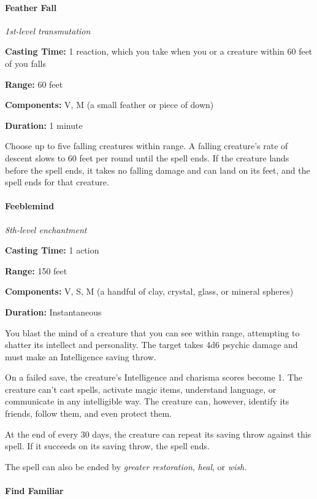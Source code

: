 \documentclass[
]{article}
\begin{document}
\hypertarget{feather-fall}{%
\paragraph{Feather Fall}\label{feather-fall}}

\emph{1st-level transmutation}

\textbf{Casting Time:} 1 reaction, which you take when you or a creature
within 60 feet of you falls

\textbf{Range:} 60 feet

\textbf{Components:} V, M (a small feather or piece of down)

\textbf{Duration:} 1 minute

Choose up to five falling creatures within range. A falling creature's
rate of descent slows to 60 feet per round until the spell ends. If the
creature lands before the spell ends, it takes no falling damage and can
land on its feet, and the spell ends for that creature.

\hypertarget{feeblemind}{%
\paragraph{Feeblemind}\label{feeblemind}}

\emph{8th-level enchantment}

\textbf{Casting Time:} 1 action

\textbf{Range:} 150 feet

\textbf{Components:} V, S, M (a handful of clay, crystal, glass, or
mineral spheres)

\textbf{Duration:} Instantaneous

You blast the mind of a creature that you can see within range,
attempting to shatter its intellect and personality. The target takes
4d6 psychic damage and must make an Intelligence saving throw.

On a failed save, the creature's Intelligence and charisma scores become
1. The creature can't cast spells, activate magic items, understand
language, or communicate in any intelligible way. The creature can,
however, identify its friends, follow them, and even protect them.

At the end of every 30 days, the creature can repeat its saving throw
against this spell. If it succeeds on its saving throw, the spell ends.

The spell can also be ended by \emph{greater restoration}, \emph{heal},
or \emph{wish.}

\hypertarget{find-familiar}{%
\paragraph{Find Familiar}\label{find-familiar}}
\end{document}
